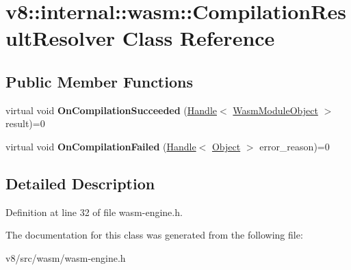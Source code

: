 \hypertarget{classv8_1_1internal_1_1wasm_1_1CompilationResultResolver}{}\section{v8\+:\+:internal\+:\+:wasm\+:\+:Compilation\+Result\+Resolver Class Reference}
\label{classv8_1_1internal_1_1wasm_1_1CompilationResultResolver}
\subsection*{Public Member Functions}
\begin{DoxyCompactItemize}
\item 
\mbox{\label{classv8_1_1internal_1_1wasm_1_1CompilationResultResolver_aa7b859f31d97b206ad20397097734df1}} 
virtual void {\bfseries On\+Compilation\+Succeeded} (\mbox{\hyperlink{classv8_1_1internal_1_1Handle}{Handle}}$<$ \mbox{\hyperlink{classv8_1_1internal_1_1WasmModuleObject}{Wasm\+Module\+Object}} $>$ result)=0
\item 
\mbox{\label{classv8_1_1internal_1_1wasm_1_1CompilationResultResolver_af9631cee6ae39400794e16b85d7ad740}} 
virtual void {\bfseries On\+Compilation\+Failed} (\mbox{\hyperlink{classv8_1_1internal_1_1Handle}{Handle}}$<$ \mbox{\hyperlink{classv8_1_1internal_1_1Object}{Object}} $>$ error\+\_\+reason)=0
\end{DoxyCompactItemize}


\subsection{Detailed Description}


Definition at line 32 of file wasm-\/engine.\+h.



The documentation for this class was generated from the following file\+:\begin{DoxyCompactItemize}
\item 
v8/src/wasm/wasm-\/engine.\+h\end{DoxyCompactItemize}
